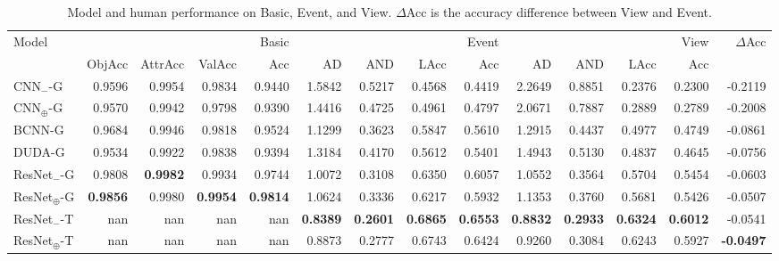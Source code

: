 \begin{table}[t]
\centering
\caption{Model and human performance on Basic, Event, and View. $\Delta$Acc is the accuracy difference between View and Event.}
\label{tab:results}
\begin{small}
\begin{tabular}{lrrrrrrrrrrrrr}
\toprule
Model & \multicolumn{4}{r}{Basic} & \multicolumn{4}{r}{Event} & \multicolumn{4}{r}{View} & $\Delta$Acc \\
 & ObjAcc & AttrAcc & ValAcc & Acc & AD & AND & LAcc & Acc & AD & AND & LAcc & Acc &  \\
\midrule
CNN$_{-}$-G & 0.9596 & 0.9954 & 0.9834 & 0.9440 & 1.5842 & 0.5217 & 0.4568 & 0.4419 & 2.2649 & 0.8851 & 0.2376 & 0.2300 & -0.2119 \\
CNN$_{\oplus}$-G & 0.9570 & 0.9942 & 0.9798 & 0.9390 & 1.4416 & 0.4725 & 0.4961 & 0.4797 & 2.0671 & 0.7887 & 0.2889 & 0.2789 & -0.2008 \\
BCNN-G & 0.9684 & 0.9946 & 0.9818 & 0.9524 & 1.1299 & 0.3623 & 0.5847 & 0.5610 & 1.2915 & 0.4437 & 0.4977 & 0.4749 & -0.0861 \\
DUDA-G & 0.9534 & 0.9922 & 0.9838 & 0.9394 & 1.3184 & 0.4170 & 0.5612 & 0.5401 & 1.4943 & 0.5130 & 0.4837 & 0.4645 & -0.0756 \\
ResNet$_{-}$-G & 0.9808 & \textbf{0.9982} & 0.9934 & 0.9744 & 1.0072 & 0.3108 & 0.6350 & 0.6057 & 1.0552 & 0.3564 & 0.5704 & 0.5454 & -0.0603 \\
ResNet$_{\oplus}$-G & \textbf{0.9856} & 0.9980 & \textbf{0.9954} & \textbf{0.9814} & 1.0624 & 0.3336 & 0.6217 & 0.5932 & 1.1353 & 0.3760 & 0.5681 & 0.5426 & -0.0507 \\
ResNet$_{-}$-T & nan & nan & nan & nan & \textbf{0.8389} & \textbf{0.2601} & \textbf{0.6865} & \textbf{0.6553} & \textbf{0.8832} & \textbf{0.2933} & \textbf{0.6324} & \textbf{0.6012} & -0.0541 \\
ResNet$_{\oplus}$-T & nan & nan & nan & nan & 0.8873 & 0.2777 & 0.6743 & 0.6424 & 0.9260 & 0.3084 & 0.6243 & 0.5927 & \textbf{-0.0497} \\
\bottomrule
\end{tabular}
\end{small}
\end{table}
